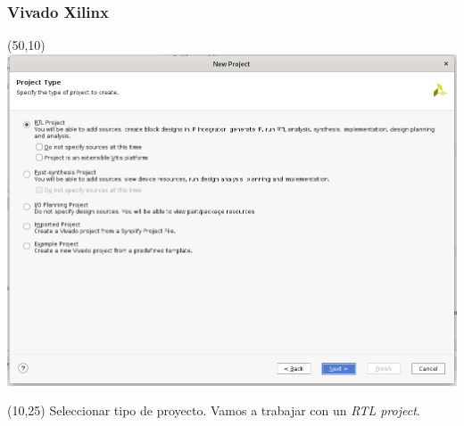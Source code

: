 \documentclass[aspectratio=169]{beamer}
\begin{document}
\begin{frame}[fragile,t]
    \frametitle{Vivado Xilinx}
    \begin{textblock}{75}(50,10) \includegraphics[scale=0.27]{img/vivado/03_project_type.png} \end{textblock}
    \begin{textblock}{38}(10,25) \small
    Seleccionar tipo de proyecto. Vamos a trabajar con un \emph{RTL project}.
    \end{textblock}
\end{frame}
    
\end{document}
